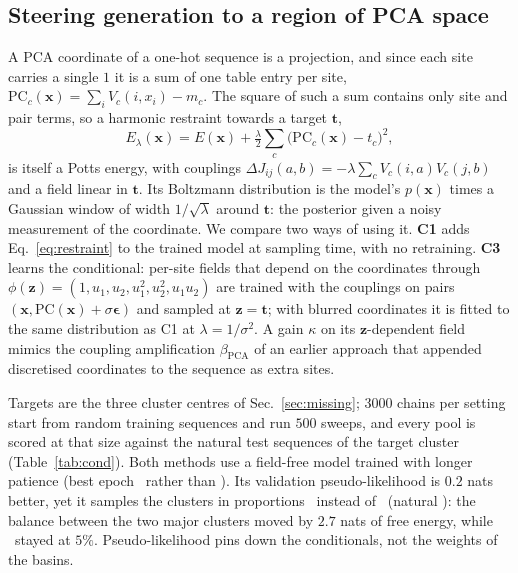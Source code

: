 \subsection{Steering generation to a region of PCA space}\label{sec:cond}
A PCA coordinate of a one-hot sequence is a projection, and since each site carries a single $1$
it is a sum of one table entry per site, $\mathrm{PC}_c(\bm x)=\sum_iV_c(i,x_i)-m_c$. The square of
such a sum contains only site and pair terms, so a harmonic restraint towards a target $\bm t$,
\begin{equation}
E_\lambda(\bm x)=E(\bm x)+\tfrac{\lambda}{2}\textstyle\sum_c\big(\mathrm{PC}_c(\bm x)-t_c\big)^2 ,
\label{eq:restraint}
\end{equation}
is itself a Potts energy, with couplings $\Delta J_{ij}(a,b)=-\lambda\sum_cV_c(i,a)V_c(j,b)$ and a field
linear in $\bm t$. Its Boltzmann distribution is the model's $p(\bm x)$ times a Gaussian window of
width $1/\sqrt\lambda$ around $\bm t$: the posterior given a noisy measurement of the coordinate.
We compare two ways of using it. \textbf{C1} adds Eq.~\eqref{eq:restraint} to the trained model at
sampling time, with no retraining. \textbf{C3} learns the conditional: per-site fields that depend
on the coordinates through $\phi(\bm z)=(1,u_1,u_2,u_1^2,u_2^2,u_1u_2)$ are trained with the couplings
on pairs $(\bm x,\mathrm{PC}(\bm x)+\sigma\bm\epsilon)$ and sampled at $\bm z=\bm t$; with blurred
coordinates it is fitted to the same distribution as C1 at $\lambda=1/\sigma^2$. A gain $\kappa$ on
its $\bm z$-dependent field mimics the coupling amplification $\beta_\mathrm{PCA}$ of an earlier
approach that appended discretised coordinates to the sequence as extra sites.

Targets are the three cluster centres of Sec.~\ref{sec:missing}; $3000$ chains per setting start
from random training sequences and run $500$ sweeps, and every pool is scored at that size against
the natural test sequences of the target cluster (Table~\ref{tab:cond}). Both methods use a
field-free model trained with longer patience (best epoch \EpBase\ rather than \EpClean). Its
validation pseudo-likelihood is $0.2$ nats better, yet it samples the clusters in proportions
\ShareBasep\ instead of \ShareClean\ (natural \ShareNat): the balance between the two major
clusters moved by $2.7$ nats of free energy, while \MissCl\ stayed at $5\%$. Pseudo-likelihood pins
down the conditionals, not the weights of the basins.

\begin{table}[t]\centering\small\setlength{\tabcolsep}{4pt}

\caption{Conditioning on each of the three cluster centres; every entry lists C0/C1/C2. In target:
fraction of samples landing in the target cluster. Distance: mean $\|\mathrm{PC}-\bm t\|$.
$r(C_{ij})$: against the natural test sequences of that cluster. HPD: fraction retaining the
J-domain motif. Diversity: mean pairwise Hamming distance inside the pool. Rejection keeps the
unconditional samples that fall in the cluster ($496$, $3000$, $948$ of $10^4$). Ceiling: $3000$
natural training sequences of the cluster.}
\label{tab:cond}
\end{table}

